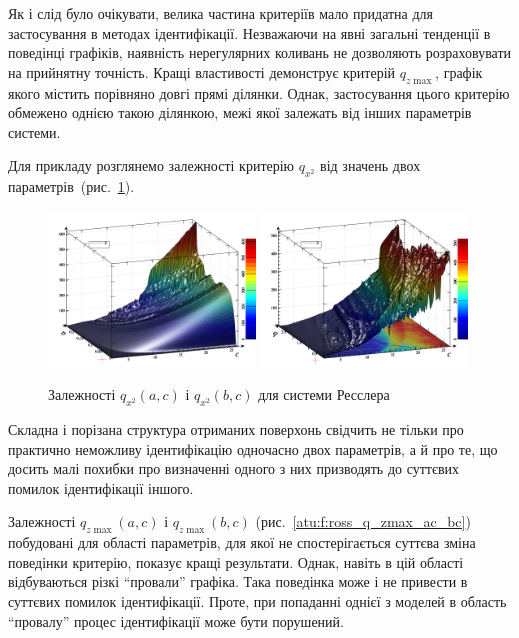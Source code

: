 Як і слід було очікувати, велика частина критеріїв мало
придатна для застосування в методах ідентифікації. Незважаючи
на явні загальні тенденції в поведінці графіків, наявність
нерегулярних коливань не дозволяють розраховувати на прийнятну
точність. Кращі властивості демонструє критерій
$ q_{z \max{}} $, графік якого містить порівняно довгі прямі
ділянки. Однак, застосування цього критерію обмежено однією такою
ділянкою, межі якої залежать від інших параметрів системи.

Для прикладу розглянемо залежності критерію
$q_{x^2} $ від значень двох параметрів~(рис.~\ref{atu:f:ross_q_x2_ac_bc}).

\begin{figure}[ht!]
\begin{center}
  \includegraphics[width=0.49\textwidth]{p/cha/ross/ross_pwr-x_a_c.png}
  \hfill
  \includegraphics[width=0.49\textwidth]{p/cha/ross/ross_pwr-x_b_c.png}
\end{center}
\caption{Залежності $ q_{x ^ 2} (a, c) $ і $ q_{x ^ 2} (b, c) $ для системи Ресслера}
\label{atu:f:ross_q_x2_ac_bc}
\end{figure}

Складна і порізана структура отриманих поверхонь свідчить не
тільки про практично неможливу ідентифікацію одночасно двох
параметрів, а й про те, що досить малі похибки про визначенні
одного з них призводять до суттєвих помилок ідентифікації
іншого.

Залежності
$ q_{z \max{}} (a, c) $ і $ q_{z \max{}} (b, c) $ (рис.~\ref{atu:f:ross_q_zmax_ac_bc})
побудовані для області
параметрів, для якої не спостерігається суттєва зміна поведінки
критерію, показує кращі результати. Однак, навіть в цій області
відбуваються різкі ``провали'' графіка. Така поведінка може і не
привести в суттєвих помилок ідентифікації. Проте, при попаданні
однієї з моделей в область ``провалу'' процес ідентифікації
може бути порушений.

